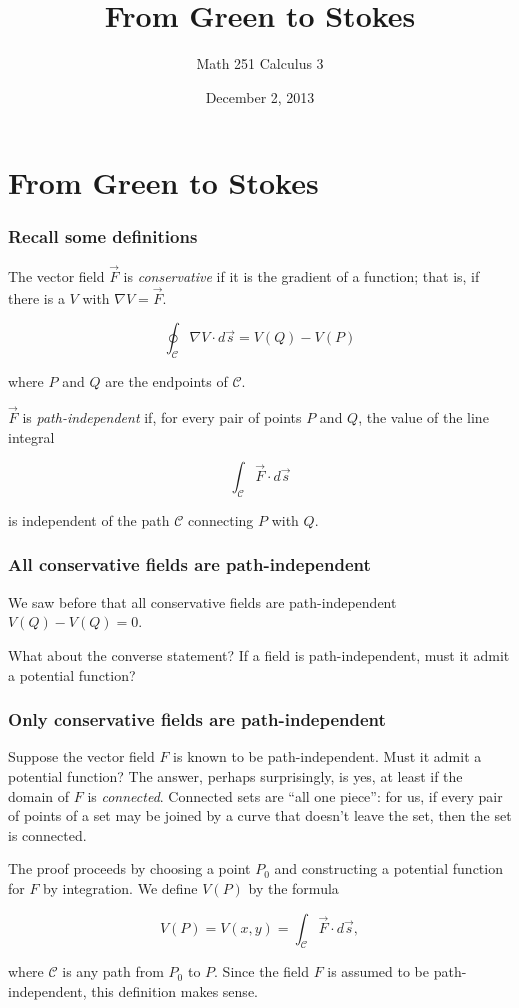 \documentclass[11pt,ignorenonframetext,aspectratio=169,xcolor={svgnames}]{beamer}
\title{From Green to Stokes}
\author{Math 251 Calculus 3}
\date{December 2, 2013}
\begin{document}
\frame{\titlepage}

\section{From Green to Stokes}

\begin{frame}\frametitle{Recall some definitions}

The vector field $\vec{F}$ is \emph{conservative} if it is the gradient
of a function; that is, if there is a $V$ with $\nabla V = \vec{F}$.

\begin{equation*}
    \oint_{\mathcal{C}} \nabla V \cdot d\vec{s} = V(Q) - V(P)
\end{equation*}

where $P$ and $Q$ are the endpoints of $\mathcal{C}$.

$\vec{F}$ is \emph{path-independent} if, for every pair of points $P$
and $Q$, the value of the line integral

\begin{equation*}
    \int_{\mathcal{C}} \vec{F} \cdot d\vec{s}
\end{equation*}

is independent of the path $\mathcal{C}$ connecting $P$ with $Q$.

\end{frame}

\begin{frame}\frametitle{All conservative fields are path-independent}

We saw before that all conservative fields are path-independent
$V(Q) - V(Q) = 0$.

What about the converse statement? If a field is path-independent, must
it admit a potential function?

\end{frame}

\begin{frame}\frametitle{Only conservative fields are path-independent}

Suppose the vector field $F$ is known to be path-independent. Must it
admit a potential function? The answer, perhaps surprisingly, is yes, at
least if the domain of $F$ is \emph{connected}. Connected sets are ``all
one piece'': for us, if every pair of points of a set may be joined by a
curve that doesn't leave the set, then the set is connected.

The proof proceeds by choosing a point $P_0$ and constructing a
potential function for $F$ by integration. We define $V(P)$ by the
formula

\[ V(P) = V(x,y) = \int_{\mathcal{C}} \vec{F} \cdot d\vec{s}, \]

where $\mathcal{C}$ is any path from $P_0$ to $P$. Since the field $F$
is assumed to be path-independent, this definition makes sense.

\end{frame}
\end{document}
